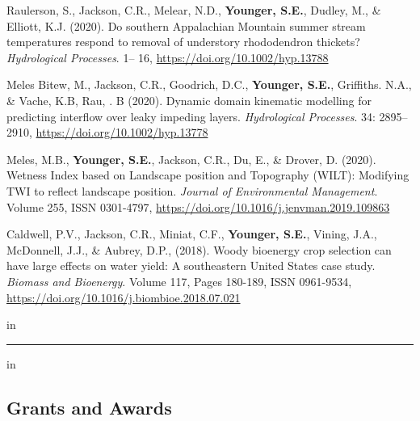 \documentclass[10pt,letterpaper]{article}
\begin{document}
\begin{hangparas}{.25in}{1}
		Raulerson, S., Jackson, C.R., Melear, N.D., \textbf{Younger, S.E.}, Dudley, M., \& Elliott, K.J. (2020). Do southern Appalachian Mountain summer stream temperatures respond to removal of understory rhododendron thickets? \textit{Hydrological Processes}. 1– 16, \url{https://doi.org/10.1002/hyp.13788}
		
		Meles Bitew, M., Jackson, C.R., Goodrich, D.C., \textbf{Younger, S.E.}, Griffiths. N.A., \& Vache, K.B, Rau, . B (2020). Dynamic domain kinematic modelling for predicting interflow over leaky impeding layers. \textit{Hydrological Processes}. 34: 2895– 2910, \url{https://doi.org/10.1002/hyp.13778}
		
		Meles, M.B., \textbf{Younger, S.E.}, Jackson, C.R., Du, E., \& Drover, D. (2020). Wetness Index based on Landscape position and Topography (WILT): Modifying TWI to reflect landscape position. \textit{Journal of Environmental Management}. Volume 255, ISSN 0301-4797, \url{https://doi.org/10.1016/j.jenvman.2019.109863}
		
		Caldwell, P.V., Jackson, C.R., Miniat, C.F., \textbf{Younger, S.E.}, Vining, J.A., McDonnell, J.J., \& Aubrey, D.P., (2018). Woody bioenergy crop selection can have large effects on water yield: A southeastern United States case study.
		\textit{Biomass and Bioenergy}. Volume 117, Pages 180-189, ISSN 0961-9534, \url{https://doi.org/10.1016/j.biombioe.2018.07.021}
		
		 in
		\vspace{-0.4em}
		
	\end{hangparas}



	
	\hrule
	\vspace{-0.4em}
	 in
	\subsection*{Grants and Awards}
	
\end{document}
